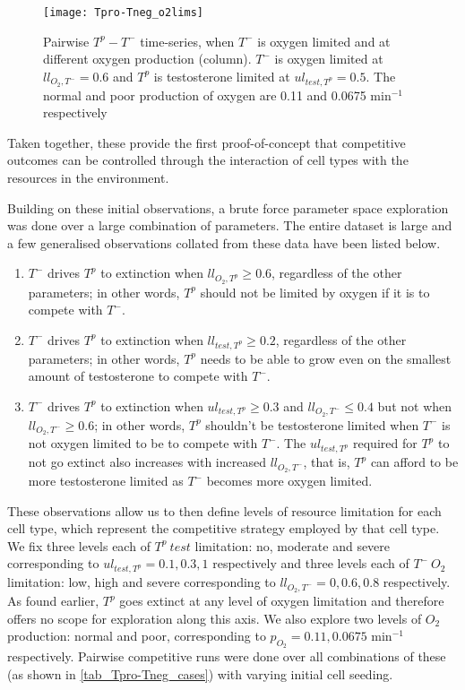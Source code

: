 \begin{figure}[h!]
  \centering
  \texttt{[image: Tpro-Tneg\_o2lims]}
  \caption[Pairwise $T^p - T^-$ time-series, oxygen limitation]{Pairwise $T^p - T^-$ time-series, when $T^-$ is oxygen limited and at different oxygen production (column). $T^-$ is oxygen limited at $ll_{O_2,T^-}=0.6$ and $T^p$ is testosterone limited at $ul_{test,T^p}=0.5$. The normal and poor production of oxygen are 0.11 and 0.0675 min$^{-1}$ respectively}
  \label{fig_Tpro-Tneg_o2lims}
\end{figure}

Taken together, these provide the first proof-of-concept that competitive outcomes can be controlled through the interaction of cell types with the resources in the environment.

\newpage

Building on these initial observations, a brute force parameter space exploration was done over a large combination of parameters. The entire dataset is large and a few generalised observations collated from these data have been listed below.
\begin{enumerate}
  \item $T^-$ drives $T^p$ to extinction when $ll_{O_2,T^p} \geq 0.6$, regardless of the other parameters; in other words, $T^p$ should not be limited by oxygen if it is to compete with $T^-$.
  \item $T^-$ drives $T^p$ to extinction when $ll_{test,T^p} \geq 0.2$, regardless of the other parameters; in other words, $T^p$ needs to be able to grow even on the smallest amount of testosterone to compete with $T^-$.
  \item $T^-$ drives $T^p$ to extinction when $ul_{test,T^p} \geq 0.3$ and $ll_{O_2,T^-} \leq 0.4$ but not when $ll_{O_2,T^-} \geq 0.6$; in other words, $T^p$ shouldn’t be testosterone limited when $T^-$ is not oxygen limited to be to compete with $T^-$. The $ul_{test,T^p}$ required for $T^p$ to not go extinct also increases with increased $ll_{O_2,T^-}$, that is, $T^p$ can afford to be more testosterone limited as $T^-$ becomes more oxygen limited.
\end{enumerate}

These observations allow us to then define levels of resource limitation for each cell type, which represent the competitive strategy employed by that cell type. We fix three levels each of $T^p\ test$ limitation: no, moderate and severe corresponding to $ul_{test,T^p}=0.1, 0.3, 1$ respectively and three levels each of $T^-\ O_2$ limitation: low, high and severe corresponding to $ll_{O_2,T^-}=0, 0.6, 0.8$ respectively. As found earlier, $T^p$ goes extinct at any level of oxygen limitation and therefore offers no scope for exploration along this axis. We also explore two levels of $O_2$ production: normal and poor, corresponding to $p_{O_2}=0.11, 0.0675$ min$^{-1}$ respectively. Pairwise competitive runs were done over all combinations of these (as shown in \autoref{tab_Tpro-Tneg_cases}) with varying initial cell seeding.

